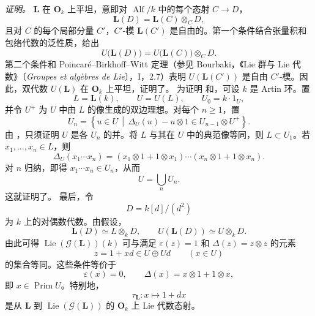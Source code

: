 \textit{证明。}
\(\mathbf L\) 在 \(\mathbf O_k\) 上平坦，意即对 \(\operatorname{Alf}/k\) 中的每个态射 \(C\to D\)，
\[
  \mathbf L(D)=\mathbf L(C)\otimes_C D,
\]
且对 \(C\) 的每个局部分量 \(C'\)，\(C'\)-模 \(\mathbf L(C')\) 是自由的。第一个条件结合张量积和包络代数的泛性质，给出
\[
  U\bigl(\mathbf L(D)\bigr)
  =
  U\bigl(\mathbf L(C)\bigr)\otimes_C D.
\]
第二个条件和 Poincaré--Birkhoff--Witt 定理\textup{（参见 Bourbaki，《Lie 群与 Lie 代数》〔\emph{Groupes et algèbres de Lie}〕，I，2.7）}表明 \(U(\mathbf L(C'))\) 是自由 \(C'\)-模。因此，双代数 \(U(\mathbf L)\) 在 \(\mathbf O_k\) 上平坦，证明了\textup{}。
为证明\textup{} 和\textup{}，可设 \(k\) 是 Artin 环。置
\[
  L=\mathbf L(k),\qquad
  U=U(L),\qquad
  U_0=k\cdot1_U,
\]
并令 \(U^+\) 为 \(U\) 中由 \(L\) 的像生成的双边理想。对每个 \(n\geq1\)，置
\[
  U_n
  =
  \left\{
    u\in U
    \,\middle|\,
    \Delta_U(u)-u\otimes1\in U_{n-1}\otimes U^+
  \right\}.
\]
由 ，只须证明 \(U\) 是各 \(U_n\) 的并。将 \(L\) 与其在 \(U\) 中的典范像等同，则 \(L\subset U_1\)。若 \(x_1,\ldots,x_n\in L\)，则
\[
  \Delta_U(x_1\cdots x_n)
  =
  (x_1\otimes1+1\otimes x_1)\cdots
  (x_n\otimes1+1\otimes x_n).
\]
对 \(n\) 归纳，即得 \(x_1\cdots x_n\in U_n\)，从而
\[
  U=\bigcup_n U_n.
\]
这就证明了\textup{}。
最后，令
\[
  D=k[d]/(d^2)
\]
为 \(k\) 上的对偶数代数。由假设，
\[
  \mathbf L(D)\simeq L\otimes_kD,
  \qquad
  U(\mathbf L(D))\simeq U\otimes_kD.
\]
由此可得 \(\operatorname{Lie}(\mathscr G(\mathbf L))(k)\) 可与满足 \(\varepsilon(z)=1\) 和 \(\Delta(z)=z\otimes z\) 的元素
\[
  z=1+xd\in U\oplus Ud
  \qquad (x\in U)
\]
的集合等同。这些条件等价于
\[
  \varepsilon(x)=0,
  \qquad
  \Delta(x)=x\otimes1+1\otimes x,
\]
即 \(x\in\operatorname{Prim}U\)。特别地，
\[
  \tau_{\mathbf L}:x\longmapsto1+dx
\]
是从 \(\mathbf L\) 到 \(\operatorname{Lie}(\mathscr G(\mathbf L))\) 的 \(\mathbf O_k\) 上 Lie 代数态射。
